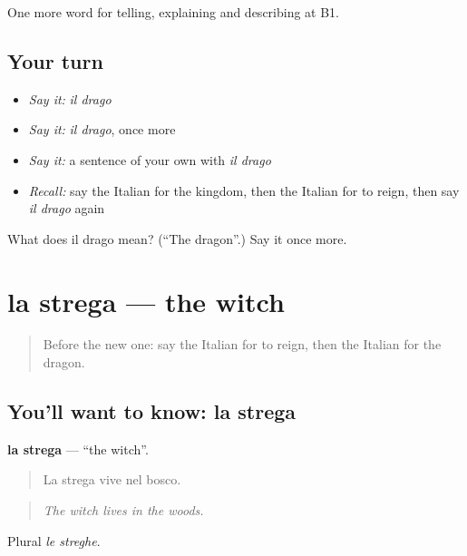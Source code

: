 \begin{grammarlens}[title={What you've built}]
One more word for telling, explaining and describing at B1.
\end{grammarlens}

\subsection*{Your turn}
\begin{itemize}
\raggedright
  \item \emph{Say it:} \emph{il drago}
  \item \emph{Say it:} \emph{il drago}, once more
  \item \emph{Say it:} a sentence of your own with \emph{il drago}
  \item \emph{Recall:} say the Italian for the kingdom, then the Italian for to reign, then say \emph{il drago} again
\end{itemize}

\begin{tcolorbox}[breakable,colback=teal!4,colframe=teal!35!black,title={Before you move on}]
What does il drago mean? (\textquotedblleft{}The dragon\textquotedblright{}.) Say it once more.
\end{tcolorbox}
\section[la strega]{la strega — the witch}

\label{lesson:IT-C326-strega}



\begin{quote}
Before the new one: say the Italian for to reign, then the Italian for the dragon.
\end{quote}

\subsection*{You'll want to know: la strega}
\textbf{la strega} — \textquotedblleft{}the witch\textquotedblright{}.

\begin{quote}
La strega vive nel bosco.
\end{quote}

\begin{quote}
\emph{The witch lives in the woods.}
\end{quote}

Plural \emph{le streghe}.

